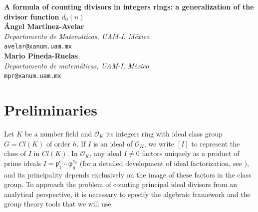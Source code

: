 \documentclass[11pt]{article}
\theoremstyle{definition}
\begin{document}
\begin{center}
{\LARGE \bf A formula of counting divisors in integers rings: a generalization of the divisor function $d_0(n)$} \\
\vskip 20pt
{\bf \'Angel Mart\'inez-Avelar}\\
{\it Departamento de Matem\'aticas, UAM-I, M\'exico}\\
{\tt avelar@xanum.uam.mx}\\
\vskip 10pt
{\bf Mario Pineda-Ruelas}\\
{\it Departamento de matem\'aticas, UAM-I, M\'exico}\\
{\tt mpr@xanum.uam.mx}\\
\end{center}

\vskip 30pt

\begin{abstract}
\noindent In this paper we establish a formal connection between the structure of ideals in integers rings and the theory of additive combinatorics. For integers rings with cyclic class groups, we prove a structural theorem demonstrating that every non-zero ideal can be decomposed into a maximal principal part and a product of ideals whose total length is bounded by the Davenport constant. With this decomposition we find divisors for generators of the ideal $I=(\alpha, \beta)$. The central result of this work is the derivation of a closed formula using character theory over finite abelian groups to count the exact number of zero-sum subsequences of a given sequence. Under the established correspondence between principal ideals and zero-sum sequences, this formula provides a precise counting of the principal ideal divisors of any given ideal, and therefore counting common divisors of generators of the ideal $I=(\alpha,\beta)$. This result constitutes a natural generalization of the classical divisor function $d_0(n)$ from unique factorization domains to any Dedekind domain with a finite class group. Finally, we characterize irreducible elements in $\mathcal{O}_K$ based on the counting of these zero-sum subsequences.
\end{abstract}


\section{Preliminaries}

Let $K$ be a number field and $\mathcal{O}_K$ its integers ring with ideal class group $G = Cl(K)$ of order $h$.  If $I$ is an ideal of $\mathcal{O}_K$, we write $[I]$ to represent the class of $I$ in $Cl(K)$.  
In $\mathcal{O}_K$, any ideal $I\not= 0$ factors uniquely as a product of prime ideals $I = \mathfrak{p}_1^{e_1} \cdots \mathfrak{p}_g^{e_g}$ (for a detailed development of ideal factorization, see \cite{Conrad}), and its principality depends exclusively on the image of these factors in the class group. To approach the problem of counting principal ideal divisors from an analytical perspective, it is necessary to specify the algebraic framework and the group theory tools that we will use.
\end{document}
